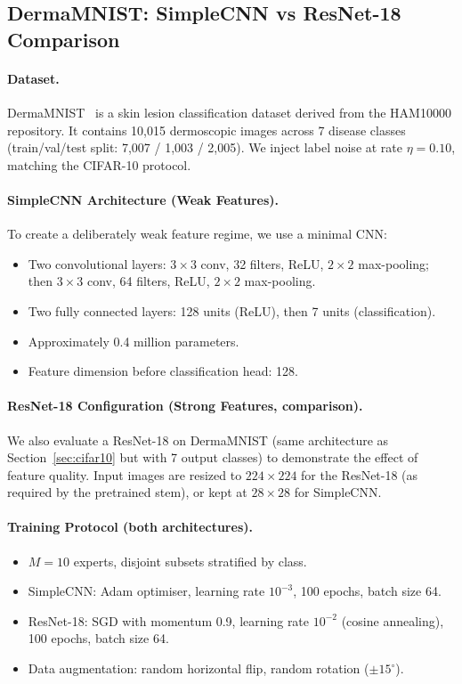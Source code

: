 \subsection{DermaMNIST: SimpleCNN vs ResNet-18 Comparison}

\paragraph{Dataset.}
DermaMNIST~\cite{yang2023medmnist} is a skin lesion classification dataset derived from the HAM10000 repository. It contains 10,015 dermoscopic images across 7 disease classes (train/val/test split: 7,007 / 1,003 / 2,005). We inject label noise at rate $\eta = 0.10$, matching the CIFAR-10 protocol.

\paragraph{SimpleCNN Architecture (Weak Features).}
To create a deliberately weak feature regime, we use a minimal CNN:
\begin{itemize}
    \item Two convolutional layers: $3 \times 3$ conv, 32 filters, ReLU, $2 \times 2$ max-pooling; then $3 \times 3$ conv, 64 filters, ReLU, $2 \times 2$ max-pooling.
    \item Two fully connected layers: 128 units (ReLU), then 7 units (classification).
    \item Approximately 0.4 million parameters.
    \item Feature dimension before classification head: 128.
\end{itemize}

\paragraph{ResNet-18 Configuration (Strong Features, comparison).}
We also evaluate a ResNet-18 on DermaMNIST (same architecture as Section~\ref{sec:cifar10} but with 7 output classes) to demonstrate the effect of feature quality. Input images are resized to $224 \times 224$ for the ResNet-18 (as required by the pretrained stem), or kept at $28 \times 28$ for SimpleCNN.

\paragraph{Training Protocol (both architectures).}
\begin{itemize}
    \item $M = 10$ experts, disjoint subsets stratified by class.
    \item SimpleCNN: Adam optimiser, learning rate $10^{-3}$, 100 epochs, batch size 64.
    \item ResNet-18: SGD with momentum 0.9, learning rate $10^{-2}$ (cosine annealing), 100 epochs, batch size 64.
    \item Data augmentation: random horizontal flip, random rotation ($\pm 15^\circ$).
\end{itemize}

